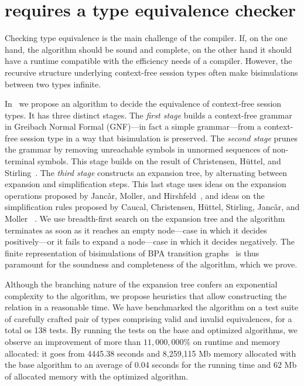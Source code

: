 \section{\freest{} requires a type equivalence checker}
\label{sec:equivalence}

Checking type equivalence is the main challenge of the
compiler. If, on the one hand, the algorithm should be sound and 
complete, on the other hand it should have a runtime compatible
with the efficiency needs of a compiler.
However, the recursive structure underlying context-free 
session types often make bisimulations between two types infinite. 

In~\cite{typeEquivalence} we propose an algorithm to decide
the equivalence of context-free session types. 
It has three distinct stages.
%
The \emph{first stage} builds a context-free grammar in Greibach
Normal Formal (GNF)---in fact a simple grammar---from a context-free
session type in a way that bisimulation is preserved.  
%
The \emph{second stage} prunes the grammar by removing unreachable
symbols in unnormed sequences of non-terminal symbols. This stage
builds on the result of Christensen, H\"uttel, and 
Stirling~\cite{DBLP:journals/iandc/ChristensenHS95}.
%
The \emph{third stage} constructs an expansion tree, by alternating
between expansion and simplification steps.  This last stage uses
ideas on the expansion operations proposed by Janc\v ar, Moller, and
Hirshfeld~\cite{hirshfeld1996bisimulation,janvcar1999techniques}, and
ideas on the simplification rules proposed by Caucal, Christensen,
H\"uttel, Stirling, Janc\v ar, and Moller
~\cite{caucal1986decidabilite,
  DBLP:journals/iandc/ChristensenHS95,janvcar1999techniques}.  
We use breadth-first search on the expansion tree and the 
algorithm terminates as soon as it reaches an empty node---case
in which it decides positively---or it fails to expand a node---case
in which it decides negatively.  
The
finite representation of bisimulations of BPA transition
graphs~\cite{caucal1986decidabilite, DBLP:journals/iandc/ChristensenHS95} 
is thus paramount for the soundness and completeness of the algorithm,
which we prove. 

Although the branching nature of the expansion tree confers an exponential 
complexity to the algorithm, we propose heuristics that allow constructing 
the relation in a reasonable time. We have benchmarked the algorithm 
on a test suite of carefully crafted pair of types comprising valid and invalid 
equivalences, for a total os 138 tests. By running the tests on the base and
optimized algorithms, we observe an improvement of more than 
$11,000,000\%$ on runtime and memory allocated: it goes from 4445.38 
seconds and 8,259,115 Mb memory allocated
with the base algorithm to an average of 0.04
seconds for the running time and 62 Mb of allocated memory with the 
optimized algorithm.


